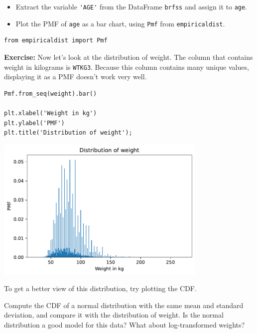 \begin{itemize}
\item
  Extract the variable \passthrough{\lstinline!'AGE'!} from the
  DataFrame \passthrough{\lstinline!brfss!} and assign it to
  \passthrough{\lstinline!age!}.
\item
  Plot the PMF of \passthrough{\lstinline!age!} as a bar chart, using
  \passthrough{\lstinline!Pmf!} from
  \passthrough{\lstinline!empiricaldist!}.
\end{itemize}

\begin{lstlisting}[]
from empiricaldist import Pmf
\end{lstlisting}

\textbf{Exercise:} Now let's look at the distribution of weight. The
column that contains weight in kilograms is
\passthrough{\lstinline!WTKG3!}. Because this column contains many
unique values, displaying it as a PMF doesn't work very well.

\begin{lstlisting}[]
Pmf.from_seq(weight).bar()

plt.xlabel('Weight in kg')
plt.ylabel('PMF')
plt.title('Distribution of weight');
\end{lstlisting}

\begin{center}
\includegraphics[width=4in]{chapters/09_relationships_files/09_relationships_33_0.pdf}
\end{center}

To get a better view of this distribution, try plotting the CDF.

Compute the CDF of a normal distribution with the same mean and standard
deviation, and compare it with the distribution of weight. Is the normal
distribution a good model for this data? What about log-transformed
weights?

